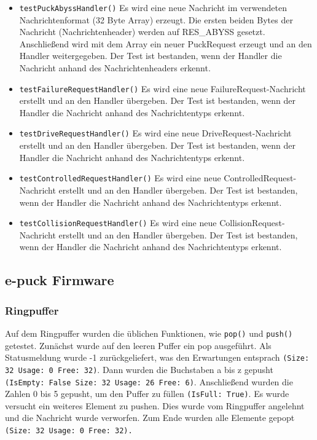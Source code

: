 \documentclass[10pt,a4paper]{article}
\begin{document}
\begin{itemize}
				\item \texttt{testPuckAbyssHandler()} Es wird eine neue Nachricht im verwendeten Nachrichtenformat (32 Byte Array) erzeugt.
				Die ersten beiden Bytes der Nachricht (Nachrichtenheader) werden auf RES\_ABYSS gesetzt. Anschließend wird mit dem Array ein
				neuer PuckRequest erzeugt und an den Handler weitergegeben.
				Der Test ist bestanden, wenn der Handler die Nachricht anhand des Nachrichtenheaders erkennt.
				\item \texttt{testFailureRequestHandler()} Es wird eine neue FailureRequest-Nachricht erstellt und an den Handler übergeben. Der Test
				ist bestanden, wenn der Handler die Nachricht anhand des Nachrichtentyps erkennt.
				\item \texttt{testDriveRequestHandler()} Es wird eine neue DriveRequest-Nachricht erstellt und an den Handler übergeben. Der Test
				ist bestanden, wenn der Handler die Nachricht anhand des Nachrichtentyps erkennt.
				\item \texttt{testControlledRequestHandler()} Es wird eine neue ControlledRequest-Nachricht erstellt und an den Handler übergeben.
				Der Test ist bestanden, wenn der Handler die Nachricht anhand des Nachrichtentyps erkennt.
				\item \texttt{testCollisionRequestHandler()} Es wird eine neue CollisionRequest-Nachricht erstellt und an den Handler übergeben. Der
				Test ist bestanden, wenn der Handler die Nachricht anhand des Nachrichtentyps erkennt.
			\end{itemize}
		
		\subsection{e-puck Firmware}
		
			\subsubsection{Ringpuffer}
			Auf dem Ringpuffer wurden die üblichen Funktionen, wie \texttt{pop()} und \texttt{push()} getestet. Zunächst wurde auf den leeren Puffer ein pop ausgeführt. Als Statusmeldung 					wurde -1 zurückgeliefert, was den Erwartungen entsprach \texttt{(Size: 32  Usage: 0  Free: 32)}. Dann wurden die Buchstaben a bis z gepusht \texttt{(IsEmpty: False Size: 32  					Usage: 26  Free: 6)}. Anschließend wurden die Zahlen 0 bis 5 gepusht, um den Puffer zu füllen \texttt{(IsFull: True)}. Es wurde versucht ein weiteres Element zu pushen. Dies 					wurde vom Ringpuffer angelehnt und die Nachricht wurde verworfen. Zum Ende wurden alle Elemente gepopt \texttt{(Size: 32  Usage: 0  Free: 32).}
\end{document}
